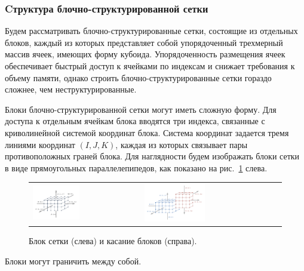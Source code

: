\subsubsection{Cтруктура блочно-структурированной сетки}

Будем рассматривать блочно-структурированные сетки, состоящие из отдельных блоков, каждый из которых представляет собой упорядоченный трехмерный массив ячеек, имеющих форму кубоида.
Упорядоченность размещения ячеек обеспечивает быстрый доступ к ячейками по индексам и снижает требования к объему памяти, однако строить блочно-структурированные сетки гораздо сложнее, чем неструктурированные.

Блоки блочно-структурированной сетки могут иметь сложную форму.
Для доступа к отдельным ячейкам блока вводятся три индекса, связанные с криволинейной системой координат блока.
Система координат задается тремя линиями координат $(I, J, K)$, каждая из которых связывает пары противоположных граней блока.
Для наглядности будем изображать блоки сетки в виде прямоугольных параллелепипедов, как показано на рис.~\ref{fig:text_2_block_block} слева.

\begin{figure}[ht]
\centering
\begin{tabular}{ll}
\includegraphics[width=0.45\textwidth]{./pics/text_2_block/1-block.pdf}
&
\includegraphics[width=0.45\textwidth]{./pics/text_2_block/2-block-block.pdf}
\end{tabular}
\singlespacing
{}\caption{Блок сетки (слева) и касание блоков (справа).}
\label{fig:text_2_block_block}
\end{figure}

Блоки могут граничить между собой.

